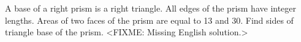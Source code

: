 \problem
A base of a right prism is a right triangle.
All edges of the prism have integer lengths.
Areas of two faces of the prism are equal to 13 and 30.
Find sides of triangle base of the prism.
\solution
<FIXME: Missing English solution.>
\endproblem
